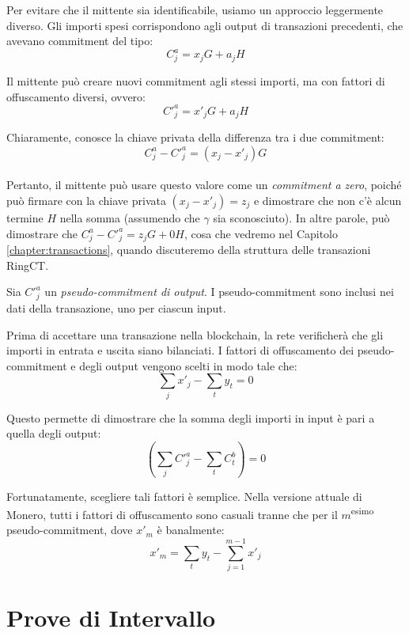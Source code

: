 Per evitare che il mittente sia identificabile, usiamo un approccio leggermente diverso. Gli importi spesi corrispondono agli output di transazioni precedenti, che avevano commitment del tipo:\vspace{.175cm}
\[C^a_{j} = x_j G + a_j H\]

Il mittente può creare nuovi commitment agli stessi importi, ma con fattori di offuscamento diversi, ovvero:
\[C'^a_{j} = x'_j G + a_j H\]

Chiaramente, conosce la chiave privata della differenza tra i due commitment: \vspace{.175cm}
\[C^a_{j} - C'^a_{j} = (x_j - x'_j) G\]\\
Pertanto, il mittente può usare questo valore come un {\em commitment a zero}, poiché può firmare con la chiave privata $(x_j - x'_j) = z_j$ e dimostrare che non c’è alcun termine $H$ nella somma (assumendo che $\gamma$ sia sconosciuto). In altre parole, può dimostrare che $C^a_{j} - C'^a_{j} = z_j G + 0H$, cosa che vedremo nel Capitolo \ref{chapter:transactions}, quando discuteremo della struttura delle transazioni RingCT.

Sia $C'^a_j$ un {\em pseudo-commitment di output}. I pseudo-commitment sono inclusi nei dati della transazione, uno per ciascun input.

Prima di accettare una transazione nella blockchain, la rete verificherà che gli importi in entrata e uscita siano bilanciati. I fattori di offuscamento dei pseudo-commitment e degli output vengono scelti in modo tale che:\vspace{.175cm}
\[\sum_j x'_j  - \sum_t y_t = 0\]

Questo permette di dimostrare che la somma degli importi in input è pari a quella degli output:\vspace{.175cm}
\[(\sum_j C'^a_{j} - \sum_t C^b_{t}) = 0\]

Fortunatamente, scegliere tali fattori è semplice. Nella versione attuale di Monero, tutti i fattori di offuscamento sono casuali tranne che per il $m$\textsuperscript{esimo} pseudo-commitment, dove $x'_m$ è banalmente:
\[x'_m = \sum_t y_t - \sum_{j=1}^{m-1} x'_j\]



\section{Prove di Intervallo}
\label{sec:range_proofs}

